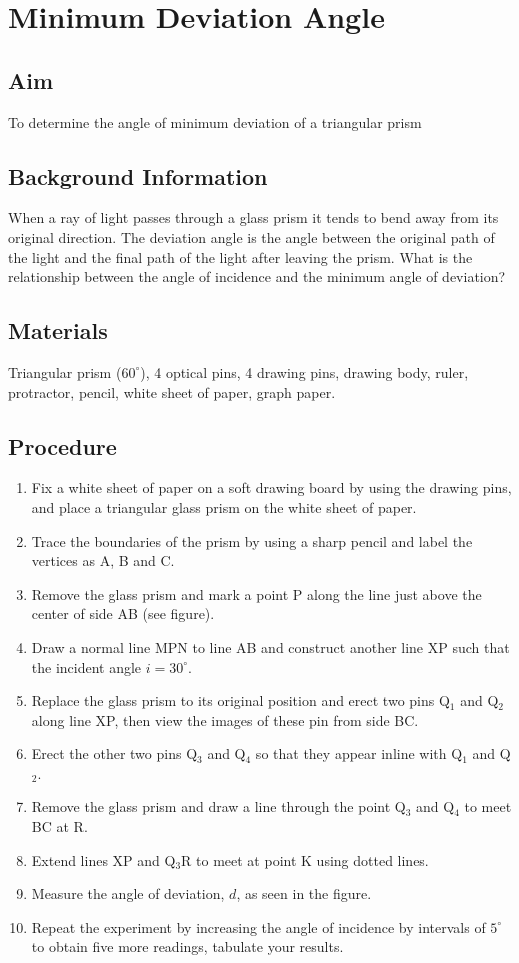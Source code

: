 \chapter{Minimum Deviation Angle}

\section{Aim}
To determine the angle of minimum deviation of a triangular prism

\section{Background Information}
When a ray of light passes through a glass prism it tends to bend away from its original direction. The deviation angle is the angle between the original path of the light and the final path of the light after leaving the prism. What is the relationship between the angle of incidence and the minimum angle of deviation?

\section{Materials}
Triangular prism ($60^\circ$), 4 optical pins, 4 drawing pins, drawing body, ruler, protractor,  pencil, white sheet of paper, graph paper.

\section{Procedure}
\begin{enumerate}
\item Fix a white sheet of paper on a soft drawing board by using the drawing pins, and place a triangular glass prism on the white sheet of paper.
\item Trace the boundaries of the prism by using a sharp pencil and label the vertices as A, B and C.
\item Remove the glass prism and mark a point P along the line just above the center of side AB (see figure).
\item Draw a normal line MPN to line AB and construct another line XP such that the incident angle $i=30^\circ$.
\item Replace the glass prism to its original position and erect two pins Q$_1$ and Q$_2$ along line XP, then view the images of these pin from side BC.
\item Erect the other two pins Q$_3$ and Q$_4$ so that they appear inline with Q$_1$ and Q$_2$.
\item Remove the glass prism and draw a line through the point Q$_3$ and Q$_4$ to meet BC at R.
\item Extend lines XP and Q$_3$R to meet at point K using dotted lines.
\item Measure the angle of deviation, $d$, as seen in the figure. 
\item Repeat the experiment by increasing the angle of incidence by intervals of $5^\circ$ to obtain five more readings, tabulate your results.
\end{enumerate}

